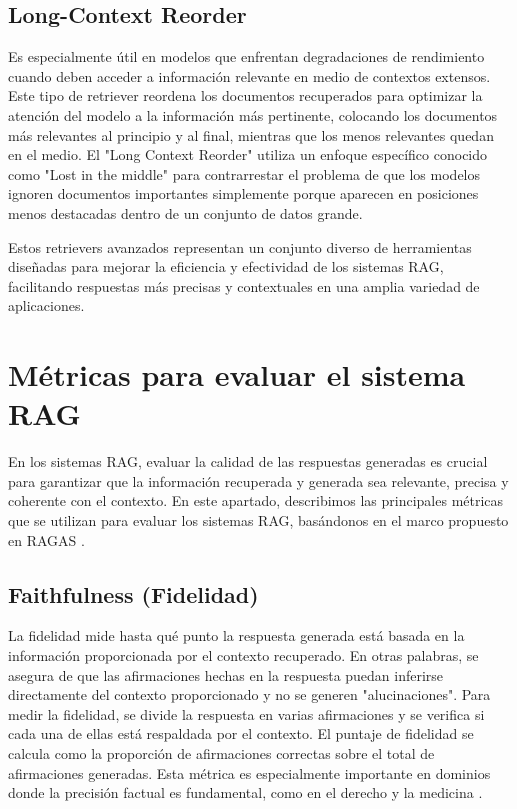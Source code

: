 \subsection{Long-Context Reorder}

Es especialmente útil en modelos que enfrentan degradaciones de rendimiento cuando deben acceder a información relevante en medio de contextos extensos. Este tipo de retriever reordena los documentos recuperados para optimizar la atención del modelo a la información más pertinente, colocando los documentos más relevantes al principio y al final, mientras que los menos relevantes quedan en el medio.
El "Long Context Reorder" utiliza un enfoque específico conocido como "Lost in the middle" para contrarrestar el problema de que los modelos ignoren documentos importantes simplemente porque aparecen en posiciones menos destacadas dentro de un conjunto de datos grande. \citep{liu2023lost}

Estos retrievers avanzados representan un conjunto diverso de herramientas diseñadas para mejorar la eficiencia y efectividad de los sistemas RAG, facilitando respuestas más precisas y contextuales en una amplia variedad de aplicaciones.

\section{Métricas para evaluar el sistema RAG}

En los sistemas RAG, evaluar la calidad de las respuestas generadas es crucial para garantizar que la información recuperada y generada sea relevante, precisa y coherente con el contexto. En este apartado, describimos las principales métricas que se utilizan para evaluar los sistemas RAG, basándonos en el marco propuesto en RAGAS \citep{ragas2023}.

\subsection{Faithfulness (Fidelidad)}
La fidelidad mide hasta qué punto la respuesta generada está basada en la información proporcionada por el contexto recuperado. En otras palabras, se asegura de que las afirmaciones hechas en la respuesta puedan inferirse directamente del contexto proporcionado y no se generen "alucinaciones". Para medir la fidelidad, se divide la respuesta en varias afirmaciones y se verifica si cada una de ellas está respaldada por el contexto. El puntaje de fidelidad se calcula como la proporción de afirmaciones correctas sobre el total de afirmaciones generadas. Esta métrica es especialmente importante en dominios donde la precisión factual es fundamental, como en el derecho y la medicina \citep{ragas2023}.

